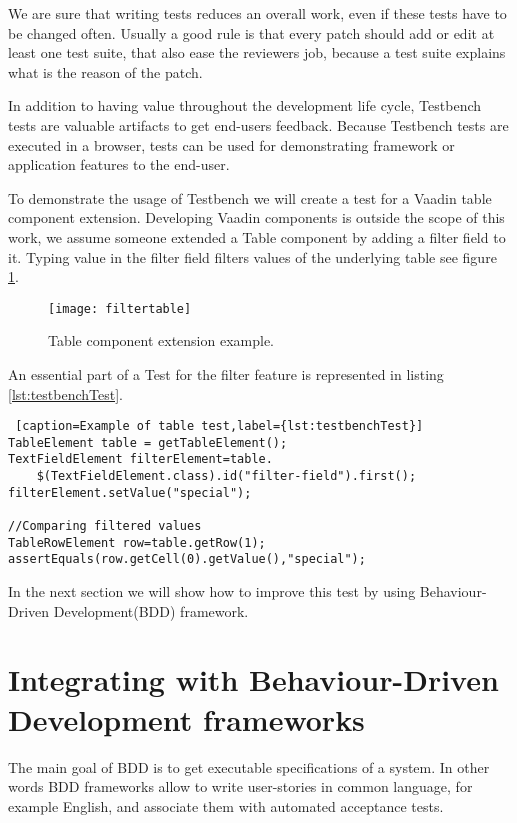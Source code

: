  We are sure that writing tests reduces an overall work,
 even if these tests have to be changed often.
 Usually a good rule is that every patch should add or edit at least one test suite, that
 also ease the reviewers job, because a test suite explains what is the reason of the patch. 

In addition to having value throughout the development life cycle,
Testbench tests are valuable artifacts to get end-users feedback.
Because Testbench tests are executed in a browser, tests can be used 
for demonstrating framework or application features to the end-user. 
  
To demonstrate the usage of Testbench we will create a test for a Vaadin table
component extension. Developing Vaadin components is outside the scope of
this work, we assume someone extended a Table component by adding a filter field to
it. Typing value in the filter field filters values of the underlying table see
figure \ref{fig:filtertable}.
	\begin{figure}
	\centering
	\texttt{[image: filtertable]}
	\caption{Table component extension example.}
	\label{fig:filtertable}
	\end{figure}

An essential  part of a Test for the filter feature is represented in listing
\ref{lst:testbenchTest}. 

 \lstset{style=a1listing}
  \begin{lstlisting} [caption=Example of table test,label={lst:testbenchTest}]
TableElement table = getTableElement();
TextFieldElement filterElement=table.
	$(TextFieldElement.class).id("filter-field").first();
filterElement.setValue("special");

//Comparing filtered values
TableRowElement row=table.getRow(1);
assertEquals(row.getCell(0).getValue(),"special");
  \end{lstlisting}

In the next section we will show how to improve this test by using
Behaviour-Driven Development(BDD) framework.

\section{Integrating with Behaviour-Driven Development frameworks}

The main goal of BDD is to get executable specifications of a system.
In other words BDD frameworks allow  to write user-stories in
common language, for example English, and associate them with automated
acceptance tests.

